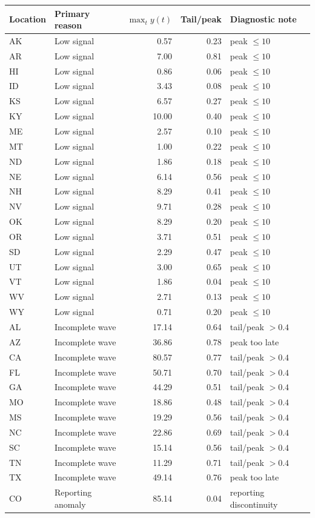 
\begin{tabular}{llrrl}
\toprule
Location & Primary reason & $\max_t y(t)$ & Tail/peak & Diagnostic note\\
\midrule
AK & Low signal & 0.57 & 0.23 & peak $\leq 10$\\
AR & Low signal & 7.00 & 0.81 & peak $\leq 10$\\
HI & Low signal & 0.86 & 0.06 & peak $\leq 10$\\
ID & Low signal & 3.43 & 0.08 & peak $\leq 10$\\
KS & Low signal & 6.57 & 0.27 & peak $\leq 10$\\
KY & Low signal & 10.00 & 0.40 & peak $\leq 10$\\
ME & Low signal & 2.57 & 0.10 & peak $\leq 10$\\
MT & Low signal & 1.00 & 0.22 & peak $\leq 10$\\
ND & Low signal & 1.86 & 0.18 & peak $\leq 10$\\
NE & Low signal & 6.14 & 0.56 & peak $\leq 10$\\
NH & Low signal & 8.29 & 0.41 & peak $\leq 10$\\
NV & Low signal & 9.71 & 0.28 & peak $\leq 10$\\
OK & Low signal & 8.29 & 0.20 & peak $\leq 10$\\
OR & Low signal & 3.71 & 0.51 & peak $\leq 10$\\
SD & Low signal & 2.29 & 0.47 & peak $\leq 10$\\
UT & Low signal & 3.00 & 0.65 & peak $\leq 10$\\
VT & Low signal & 1.86 & 0.04 & peak $\leq 10$\\
WV & Low signal & 2.71 & 0.13 & peak $\leq 10$\\
WY & Low signal & 0.71 & 0.20 & peak $\leq 10$\\
AL & Incomplete wave & 17.14 & 0.64 & tail/peak $>0.4$\\
AZ & Incomplete wave & 36.86 & 0.78 & peak too late\\
CA & Incomplete wave & 80.57 & 0.77 & tail/peak $>0.4$\\
FL & Incomplete wave & 50.71 & 0.70 & tail/peak $>0.4$\\
GA & Incomplete wave & 44.29 & 0.51 & tail/peak $>0.4$\\
MO & Incomplete wave & 18.86 & 0.48 & tail/peak $>0.4$\\
MS & Incomplete wave & 19.29 & 0.56 & tail/peak $>0.4$\\
NC & Incomplete wave & 22.86 & 0.69 & tail/peak $>0.4$\\
SC & Incomplete wave & 15.14 & 0.56 & tail/peak $>0.4$\\
TN & Incomplete wave & 11.29 & 0.71 & tail/peak $>0.4$\\
TX & Incomplete wave & 49.14 & 0.76 & peak too late\\
CO & Reporting anomaly & 85.14 & 0.04 & reporting discontinuity\\
\bottomrule
\end{tabular}
